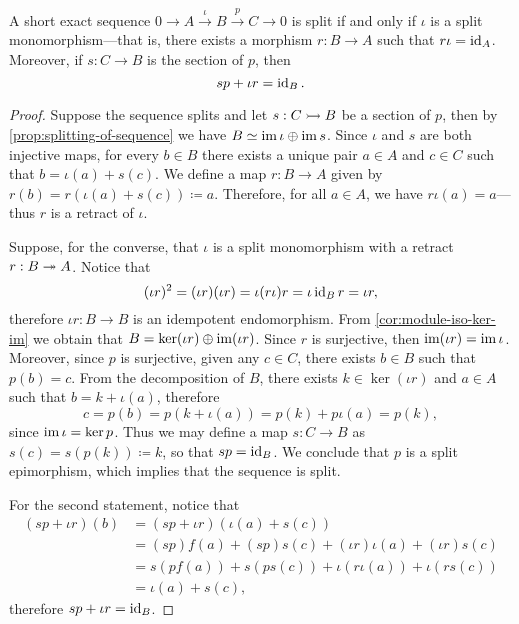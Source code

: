 \begin{proposition}
\label{prop:split-short-exact-sequence}
A short exact sequence \(0 \to A \xrightarrow \iota B \xrightarrow p C \to 0\)
is split if and only if \(\iota\) is a split monomorphism---that is, there
exists a morphism \(r: B \to A\) such that \(r \iota = \operatorname{id}_A\). Moreover, if
\(s: C \to B\) is the section of \(p\), then
\[
s p + \iota r = \operatorname{id}_B.
\]
\end{proposition}

\begin{proof}
Suppose the sequence splits and let \(s: C \rightarrowtail B\) be a section of \(p\), then
by \cref{prop:splitting-of-sequence} we have \(B \simeq \operatorname{im} \iota \oplus \operatorname{im}
s\). Since \(\iota\) and \(s\) are both injective maps, for every \(b \in B\)
there exists a unique pair \(a \in A\) and \(c \in C\) such that
\(b = \iota(a) + s(c)\). We define a map \(r: B \to A\) given by
\(r(b) = r(\iota(a) + s(c)) \coloneq a\). Therefore, for all \(a \in A\), we
have \(r \iota(a) = a\)---thus \(r\) is a retract of \(\iota\).

Suppose, for the converse, that \(\iota\) is a split monomorphism with a retract
\(r: B \twoheadrightarrow A\). Notice that
\[
(\iota r)^2 = (\iota r) (\iota r) = \iota (r \iota) r = \iota \operatorname{id}_B r
= \iota r,
\]
therefore \(\iota r: B \to B\) is an idempotent endomorphism. From
\cref{cor:module-iso-ker-im} we obtain that \(B = \ker(\iota r) \oplus \operatorname{im}(\iota
r)\). Since \(r\) is surjective, then \(\operatorname{im}(\iota r) = \operatorname{im} \iota\). Moreover,
since \(p\) is surjective, given any \(c \in C\), there exists \(b \in B\) such
that \(p(b) = c\). From the decomposition of \(B\), there exists \(k \in
\ker(\iota r)\) and \(a \in A\) such that \(b = k + \iota(a)\), therefore
\[
c = p(b) = p(k + \iota(a)) = p(k) + p \iota(a) = p(k),
\]
since \(\operatorname{im} \iota = \ker p\). Thus we may define a map \(s: C \to B\) as
\(s(c) = s(p(k)) \coloneq k\), so that \(s p = \operatorname{id}_B\). We conclude that \(p\)
is a split epimorphism, which implies that the sequence is split.

For the second statement, notice that
\begin{align*}
(s p + \iota r)(b)
&= (s p + \iota r)(\iota(a) + s(c)) \\
&= (s p) f(a) + (s p) s(c) + (\iota r) \iota(a) + (\iota r) s(c) \\
&= s (p f(a)) + s (p s(c)) + \iota (r \iota(a)) + \iota (r s(c)) \\
&= \iota(a) + s(c),
\end{align*}
therefore \(s p + \iota r = \operatorname{id}_B\).
\end{proof}

